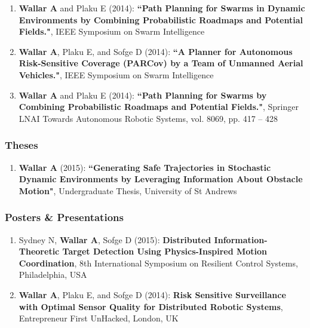 \documentclass[line,margin]{cv}
\begin{document}
\begin{resume}
\begin{enumerate}
    \item \textbf{Wallar A} and Plaku E (2014): \textbf{``Path Planning for
        Swarms in Dynamic Environments by Combining Probabilistic Roadmaps
        and Potential Fields."}, IEEE Symposium on Swarm Intelligence

    \item \textbf{Wallar A}, Plaku E, and Sofge D (2014): \textbf{``A Planner
        for Autonomous Risk-Sensitive Coverage (PARCov) by a Team of Unmanned
        Aerial Vehicles."}, IEEE Symposium on Swarm Intelligence

    \item \textbf{Wallar A} and Plaku E (2014): \textbf{``Path Planning for
        Swarms by Combining Probabilistic Roadmaps and Potential Fields."},
        Springer LNAI Towards Autonomous Robotic Systems, vol. 8069,
        pp. 417 -- 428

\end{enumerate}

\subsubsection{Theses}

\begin{enumerate}

    \item \textbf{Wallar A} (2015): \textbf{``Generating Safe Trajectories
        in Stochastic Dynamic Environments by Leveraging Information About
        Obstacle Motion"}, Undergraduate Thesis, University of St Andrews

\end{enumerate}


\subsubsection{Posters \& Presentations}

\begin{enumerate}

    \item Sydney N, \textbf{Wallar A}, Sofge D (2015):
        \textbf{Distributed Information-Theoretic Target Detection Using
            Physics-Inspired Motion Coordination}, 8th International Symposium on
            Resilient Control Systems, Philadelphia, USA

    \item \textbf{Wallar A}, Plaku E, and Sofge D (2014): \textbf{Risk
        Sensitive Surveillance with Optimal Sensor Quality for Distributed
        Robotic Systems}, Entrepreneur First UnHacked, London, UK


\end{enumerate}
\end{resume}
\end{document}
